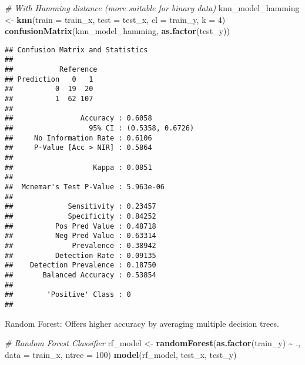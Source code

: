\documentclass[
]{article}
\newenvironment{Shaded}{\begin{snugshade}}{\end{snugshade}}
\newcommand{\AttributeTok}[1]{\textcolor[rgb]{0.13,0.29,0.53}{#1}}
\newcommand{\CommentTok}[1]{\textcolor[rgb]{0.56,0.35,0.01}{\textit{#1}}}
\newcommand{\DecValTok}[1]{\textcolor[rgb]{0.00,0.00,0.81}{#1}}
\newcommand{\FunctionTok}[1]{\textcolor[rgb]{0.13,0.29,0.53}{\textbf{#1}}}
\newcommand{\NormalTok}[1]{#1}
\newcommand{\OtherTok}[1]{\textcolor[rgb]{0.56,0.35,0.01}{#1}}
\newcommand{\SpecialCharTok}[1]{\textcolor[rgb]{0.81,0.36,0.00}{\textbf{#1}}}
\begin{document}
\begin{Shaded}
\begin{Highlighting}[]
\CommentTok{\# With Hamming distance (more suitable for binary data)}
\NormalTok{knn\_model\_hamming }\OtherTok{\textless{}{-}} \FunctionTok{knn}\NormalTok{(}\AttributeTok{train =}\NormalTok{ train\_x, }\AttributeTok{test =}\NormalTok{ test\_x, }\AttributeTok{cl =}\NormalTok{ train\_y, }\AttributeTok{k =} \DecValTok{4}\NormalTok{)}
\FunctionTok{confusionMatrix}\NormalTok{(knn\_model\_hamming, }\FunctionTok{as.factor}\NormalTok{(test\_y))}
\end{Highlighting}
\end{Shaded}

\begin{verbatim}
## Confusion Matrix and Statistics
## 
##           Reference
## Prediction   0   1
##          0  19  20
##          1  62 107
##                                           
##                Accuracy : 0.6058          
##                  95% CI : (0.5358, 0.6726)
##     No Information Rate : 0.6106          
##     P-Value [Acc > NIR] : 0.5864          
##                                           
##                   Kappa : 0.0851          
##                                           
##  Mcnemar's Test P-Value : 5.963e-06       
##                                           
##             Sensitivity : 0.23457         
##             Specificity : 0.84252         
##          Pos Pred Value : 0.48718         
##          Neg Pred Value : 0.63314         
##              Prevalence : 0.38942         
##          Detection Rate : 0.09135         
##    Detection Prevalence : 0.18750         
##       Balanced Accuracy : 0.53854         
##                                           
##        'Positive' Class : 0               
## 
\end{verbatim}

Random Forest: Offers higher accuracy by averaging multiple decision
trees.

\begin{Shaded}
\begin{Highlighting}[]
\CommentTok{\# Random Forest Classifier}
\NormalTok{rf\_model }\OtherTok{\textless{}{-}} \FunctionTok{randomForest}\NormalTok{(}\FunctionTok{as.factor}\NormalTok{(train\_y) }\SpecialCharTok{\textasciitilde{}}\NormalTok{ ., }\AttributeTok{data =}\NormalTok{ train\_x, }\AttributeTok{ntree =} \DecValTok{100}\NormalTok{)}
\FunctionTok{model}\NormalTok{(rf\_model, test\_x, test\_y)}
\end{Highlighting}
\end{Shaded}
\end{document}
